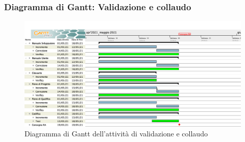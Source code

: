 \subsubsection{Diagramma di Gantt: Validazione e collaudo}\label{GanttValidazione}
\begin{figure}[ht]
    \centering
    \includegraphics[width=\textwidth]{Immagini/GanttValidazione}
    \caption{Diagramma di Gantt dell'attività di validazione e collaudo}
\end{figure}